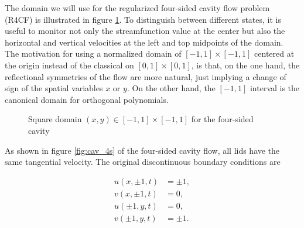 The domain we will use for the regularized four-sided cavity flow problem
(R4CF) is illustrated in figure \ref{fig:cav_domain}. To distinguish between
different states, it is useful to monitor not only the streamfunction value at
the center but also the horizontal and vertical velocities at the left and top
midpoints of the domain. The motivation for using a normalized domain of
$[-1,1]\times[-1,1]$ centered at the origin instead of the classical on
$[0,1]\times[0,1]$, is that, on the one hand, the reflectional symmetries of
the flow are more natural, just implying a change of sign of the spatial
variables $x$ or $y$. On the other hand, the $[-1,1]$ interval is the canonical
domain for orthogonal polynomials. 

\begin{figure}[ht]
\centering
{}
\caption{Square domain $(x,y) \in [-1,1]\times[-1,1]$ for the four-sided cavity}
\label{fig:cav_domain}
\end{figure}

As shown in figure \ref{fig:cav_4s} of the four-sided cavity flow, all lids
have the same tangential velocity. The original discontinuous boundary
conditions are

\begin{align}
u(x,\pm 1,t) &= \pm 1,\label{non_reg_u_bca} \\
v(x,\pm 1,t) &= 0, \\
u(\pm 1,y,t) &= 0, \\
v(\pm 1,y,t) &= \pm 1.\label{non_reg_u_bcb}
\end{align}

